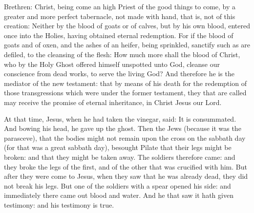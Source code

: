 





Brethren: Christ, being come an high Priest of the good things to come,
by a greater and more perfect tabernacle, not made with hand, that is,
not of this creation:
Neither by the blood of goats or of calves, but by his own blood,
entered once into the Holies, having obtained eternal redemption.
For if the blood of goats and of oxen, and the ashes of an heifer,
being sprinkled, sanctify such as are defiled, to the cleansing of the
flesh:
How much more shall the blood of Christ, who by the Holy Ghost
offered himself unspotted unto God, cleanse our conscience from dead
works, to serve the living God?
And therefore he is the mediator of the new testament: that by
means of his death for the redemption of those transgressions which were
under the former testament, they that are called may receive the promise
of eternal inheritance, in Christ Jesus our Lord.

\bigskip


At that time, Jesus, when he had taken the vinegar, said: It is
consummated. And bowing his head, he gave up the ghost.
Then the Jews (because it was the parasceve), that the bodies
might not remain upon the cross on the sabbath day (for that was a great
sabbath day), besought Pilate that their legs might be broken: and that
they might be taken away.
The soldiers therefore came: and they broke the legs of the
first, and of the other that was crucified with him.
But after they were come to Jesus, when they saw that he was
already dead, they did not break his legs.
But one of the soldiers with a spear opened his side: and
immediately there came out blood and water.
And he that saw it hath given testimony: and his testimony is
true. 

\bigskip

~

\columnbreak



